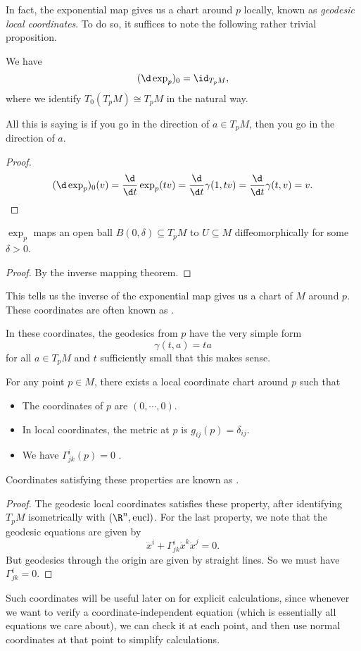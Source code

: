 \documentclass[a4paper]{article}
\begin{document}
In fact, the exponential map gives us a chart around $p$ locally, known as \emph{geodesic local coordinates}. To do so, it suffices to note the following rather trivial proposition.

\begin{prop}
  We have
  \[
    (\d \exp_p)_0 = \id _{T_p M},
  \]
  where we identify $T_0 (T_p M) \cong T_p M$ in the natural way.
\end{prop}
All this is saying is if you go in the direction of $a \in T_p M$, then you go in the direction of $a$.

\begin{proof}
   \[
     (\d \exp_p)_0(v) = \frac{\d}{\d t} \exp_p(tv) = \frac{\d}{\d t} \gamma(1, tv) = \frac{\d}{\d t} \gamma(t, v) = v.
   \]
\end{proof}

\begin{cor}
  $\exp_p$ maps an open ball $B(0, \delta) \subseteq T_p M$ to $U \subseteq M$ diffeomorphically for some $\delta > 0$.
\end{cor}

\begin{proof}
  By the inverse mapping theorem.
\end{proof}

This tells us the inverse of the exponential map gives us a chart of $M$ around $p$. These coordinates are often known as .

In these coordinates, the geodesics from $p$ have the very simple form
\[
  \gamma(t, a) = ta
\]
for all $a \in T_p M$ and $t$ sufficiently small that this makes sense.

\begin{cor}
  For any point $p \in M$, there exists a local coordinate chart around $p$ such that
  \begin{itemize}
    \item The coordinates of $p$ are $(0, \cdots, 0)$.
    \item In local coordinates, the metric at $p$ is $g_{ij}(p) = \delta_{ij}$.
    \item We have $\Gamma^i_{jk}(p) = 0$ .
  \end{itemize}
\end{cor}
Coordinates satisfying these properties are known as .
\begin{proof}
  The geodesic local coordinates satisfies these property, after identifying $T_p M$ isometrically with $(\R^n, \mathrm{eucl})$. For the last property, we note that the geodesic equations are given by
  \[
    \ddot{x}^i + \Gamma^i_{jk}\dot{x}^k \dot{x}^j = 0.
  \]
  But geodesics through the origin are given by straight lines. So we must have $\Gamma^i_{jk} = 0$.
\end{proof}
Such coordinates will be useful later on for explicit calculations, since whenever we want to verify a coordinate-independent equation (which is essentially all equations we care about), we can check it at each point, and then use normal coordinates at that point to simplify calculations.
\end{document}
